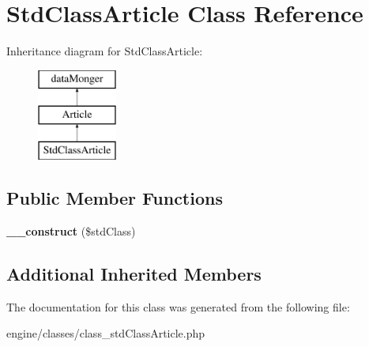 \hypertarget{classStdClassArticle}{\section{Std\-Class\-Article Class Reference}
\label{classStdClassArticle}
}
Inheritance diagram for Std\-Class\-Article\-:\begin{figure}[H]
\begin{center}
\leavevmode
\includegraphics[height=3.000000cm]{classStdClassArticle}
\end{center}
\end{figure}
\subsection*{Public Member Functions}
\begin{DoxyCompactItemize}
\item 
\hypertarget{classStdClassArticle_a3c87fc853cde465020a5bfa5f32bea3d}{{\bfseries \-\_\-\-\_\-construct} (\$std\-Class)}\label{classStdClassArticle_a3c87fc853cde465020a5bfa5f32bea3d}

\end{DoxyCompactItemize}
\subsection*{Additional Inherited Members}


The documentation for this class was generated from the following file\-:\begin{DoxyCompactItemize}
\item 
engine/classes/class\-\_\-std\-Class\-Article.\-php\end{DoxyCompactItemize}
